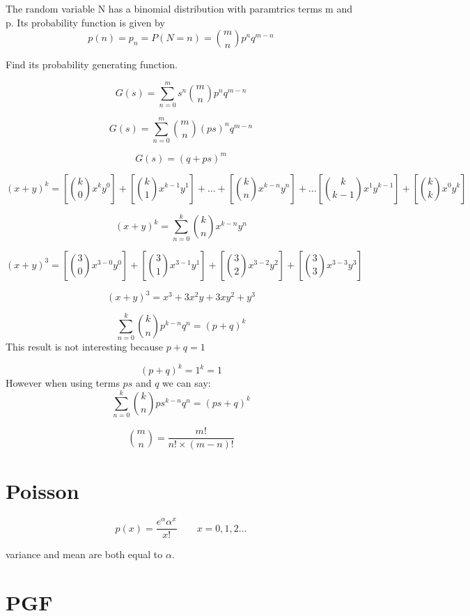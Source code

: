 The random variable N has a binomial distribution with paramtrics
terms m and p. Its probability function is given by
\begin{equation}
p(n) = p_n  = P(N=n) = {m \choose n}p^nq^{m-n}
\end{equation}

Find its probability generating function.

\begin{equation}
G(s) =  \sum_{n=0}^{m} s^n {m \choose n} p^nq^{m-n}
\end{equation}

\begin{equation}
G(s) =  \sum_{n=0}^{m} {m \choose n} (ps)^n q^{m-n}
\end{equation}


\begin{equation}
G(s) =  (q + ps)^m
\end{equation}


\[
(x + y)^k = [{k \choose 0}x^{k}y^{0}] + [{k \choose
	1}x^{k-1}y^{1}] +  \dots + [{k \choose n}x^{k-n}y^{n}] + \dots [{k
	\choose k-1}x^{1}y^{k-1}] + [ {k \choose k}x^{0}y^{k}]
\]

\[
(x + y)^k = \sum_{n=0}^{k} {k \choose n}x^{k-n}y^{n}
\]

\[
(x + y)^3 = \left[{3 \choose 0}x^{3-0}y^{0}\right] + \left[{3
	\choose 1}x^{3-1}y^{1}\right] +  \left[ {3 \choose
	2}x^{3-2}y^{2}\right] + \left[ {3 \choose 3}x^{3-3}y^{3}\right]
\]

\[
(x + y)^3 = x^{3} + 3x^2y + 3xy^2 + y^{3}
\]


\[
\sum_{n=0}^{k} {k \choose n}p^{k-n}q^{n} = (p + q)^k
\]
This result is not interesting because $p+q=1$

\[
(p + q)^k = 1^{k} = 1
\]
However when using terms $ps$ and $q$ we can say:
\[
\sum_{n=0}^{k} {k \choose n}ps^{k-n}q^{n} = (ps + q)^k
\]


\[
{m \choose n}  = \frac{m!}{n! \times (m-n)!} \]

\section{Poisson}

\[ p(x) = \frac{e^{\alpha}\alpha^{x}}{x!} \qquad x = 0, 1,2 \dots
\]

variance and mean are both equal to $\alpha$.

\section{PGF}

